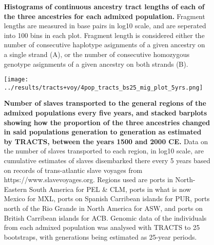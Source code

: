 \documentclass[11pt]{article}
\begin{document}
\begin{figure}[htb!]%
    \centering
    \vspace*{-1em}
    \vspace{.2cm}
    \caption{\textbf{
        Histograms of continuous ancestry tract lengths of each of the three ancestries for each admixed population.
    }
        Fragment lengths are measured in base pairs in log10 scale, and are seperated into 100 bins in each plot. Fragment length is considered either the number of consecutive haplotype asignments of a given ancestry on a single strand (A), or the number of consecutive homozygous genotype asignments of a given ancestry on both strands (B).
    }
\end{figure}



\begin{figure}[htb!]%
    \centering
    \texttt{[image: 
        ../results/tracts+voy/4pop\_tracts\_bs25\_mig\_plot\_5yrs.png]}
    \vspace{-.2cm}
    \caption{\textbf{
        Number of slaves transported to the general regions of the admixed populations every five years, and stacked barplots showing how the proportion of the three ancestries changed in said populations generation to generation as estimated by TRACTS, between the years 1500 and 2000 CE.
    }
        Data on the number of slaves transported to each region, in log10 scale, are cumulative estimates of slaves disembarked there every 5 years based on records of trans-atlantic slave voyages from https://www.slavevoyages.org. Regions used are ports in North-Eastern South America for PEL \& CLM, ports in what is now Mexico for MXL, ports on Spanish Carribean islands for PUR, ports north of the Rio Grande in North America for ASW, and ports on British Carribean islands for ACB. Genomic data of the individuals from each admixed population was analysed with TRACTS to 25 bootstraps, with generations being estimated as 25-year periods.
    }
\end{figure}





\vspace{8mm}
\end{document}
